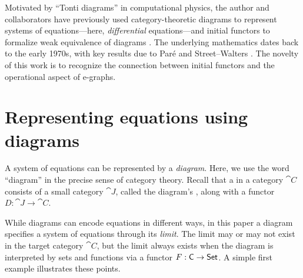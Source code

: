 \documentclass[11pt]{article}
\numberwithin{equation}{section}
\begin{document}
Motivated by ``Tonti diagrams'' in computational physics, the author and
collaborators have previously used category-theoretic diagrams to represent
systems of equations---here, \emph{differential} equations---and initial
functors to formalize weak equivalence of diagrams
\cite{patterson2023,carlson2024}. The underlying mathematics dates back to the
early 1970s, with key results due to Par{\'e} \cite{pare1973} and Street--Walters
\cite{street1973}. The novelty of this work is to recognize the connection between
initial functors and the operational aspect of e-graphs.

\section{Representing equations using diagrams}
\label{sec:representation}

A system of equations can be represented by a \emph{diagram}. Here, we use the
word ``diagram'' in the precise sense of category theory. Recall that a
 in a category $\cat{C}$ consists of a small category $\cat{J}$,
called the diagram's , along with a functor
$D: \cat{J} \to \cat{C}$.

While diagrams can encode equations in different ways, in this paper a diagram
specifies a system of equations through its \emph{limit}. The limit may or may
not exist in the target category $\cat{C}$, but the limit always exists when the
diagram is interpreted by sets and functions via a functor $F: \mathsf{C} \to \mathsf{Set}$.
A simple first example illustrates these points.
\end{document}
